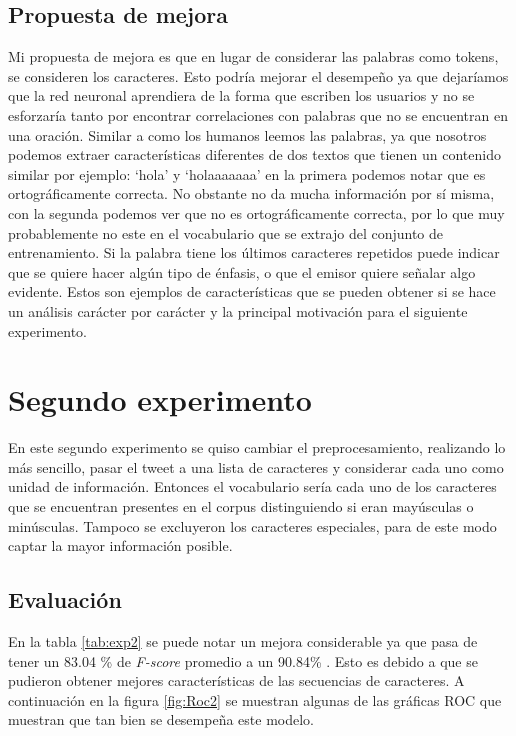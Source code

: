 \subsection{Propuesta de mejora}

\par Mi propuesta de mejora es que en lugar de considerar las palabras como tokens, se consideren los caracteres. Esto podría mejorar el desempeño ya que dejaríamos que la red neuronal aprendiera de la forma que escriben los usuarios y no se esforzaría tanto por encontrar correlaciones con palabras que no se encuentran en una oración. Similar a como los humanos leemos las palabras, ya que nosotros podemos extraer características diferentes de dos textos que tienen un contenido similar por ejemplo: `hola' y `holaaaaaaa' en la primera podemos notar que es ortográficamente correcta. No obstante no da mucha información por sí misma, con la segunda podemos ver que no es ortográficamente correcta, por lo que muy probablemente no este en el vocabulario que se extrajo del conjunto de entrenamiento. Si la palabra tiene los últimos caracteres repetidos puede indicar que se quiere hacer algún tipo de énfasis, o que el emisor quiere señalar algo evidente. Estos son ejemplos de características que se pueden obtener si se hace un análisis carácter por carácter y la principal motivación para el siguiente experimento.

\section{Segundo experimento}
\par En este segundo experimento se quiso cambiar el preprocesamiento, realizando lo más sencillo, pasar el tweet a una lista de caracteres y considerar cada uno como unidad de información. Entonces el vocabulario sería cada uno de los caracteres que se encuentran presentes en el corpus distinguiendo si eran mayúsculas o minúsculas. Tampoco se excluyeron los caracteres especiales, para de este modo captar la mayor información posible.
\subsection{Evaluación}
\begin{center}
	
\end{center}


\par En la tabla \ref{tab:exp2} se puede notar un mejora considerable ya que pasa de tener un 83.04 \% de \textit{F-score} promedio a un 90.84\% . Esto es debido a que se pudieron obtener mejores características de las secuencias de caracteres. A continuación en la figura \ref{fig:Roc2} se muestran algunas de las gráficas ROC que muestran que tan bien se desempeña este modelo.

